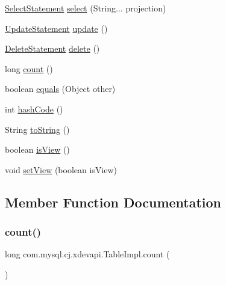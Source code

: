 \begin{DoxyCompactItemize}
\item 
\mbox{\hyperlink{interfacecom_1_1mysql_1_1cj_1_1xdevapi_1_1_select_statement}{Select\+Statement}} \mbox{\hyperlink{classcom_1_1mysql_1_1cj_1_1xdevapi_1_1_table_impl_a048429d90cca804cd60ce9a49f5b12fd}{select}} (String... projection)
\item 
\mbox{\hyperlink{interfacecom_1_1mysql_1_1cj_1_1xdevapi_1_1_update_statement}{Update\+Statement}} \mbox{\hyperlink{classcom_1_1mysql_1_1cj_1_1xdevapi_1_1_table_impl_a4f6da4761f5ff7becb0737c11b0ea0db}{update}} ()
\item 
\mbox{\hyperlink{interfacecom_1_1mysql_1_1cj_1_1xdevapi_1_1_delete_statement}{Delete\+Statement}} \mbox{\hyperlink{classcom_1_1mysql_1_1cj_1_1xdevapi_1_1_table_impl_ab12665d608984e6774957947f6a22c7c}{delete}} ()
\item 
long \mbox{\hyperlink{classcom_1_1mysql_1_1cj_1_1xdevapi_1_1_table_impl_a855ae05acfd531e69738a8a88824fe8c}{count}} ()
\item 
boolean \mbox{\hyperlink{classcom_1_1mysql_1_1cj_1_1xdevapi_1_1_table_impl_a0f66e0bb59cb1537222b61858537daa3}{equals}} (Object other)
\item 
int \mbox{\hyperlink{classcom_1_1mysql_1_1cj_1_1xdevapi_1_1_table_impl_aeba962a3af205b868ef18847f8f166a8}{hash\+Code}} ()
\item 
String \mbox{\hyperlink{classcom_1_1mysql_1_1cj_1_1xdevapi_1_1_table_impl_aa7bfb3a165db21c34060c5cbb6b111b2}{to\+String}} ()
\item 
boolean \mbox{\hyperlink{classcom_1_1mysql_1_1cj_1_1xdevapi_1_1_table_impl_a92b2db897ad5ce4f950422956bfc4027}{is\+View}} ()
\item 
void \mbox{\hyperlink{classcom_1_1mysql_1_1cj_1_1xdevapi_1_1_table_impl_ae3b7e58d7a85393a4d2baf8115acf90c}{set\+View}} (boolean is\+View)
\end{DoxyCompactItemize}


\subsection{Member Function Documentation}
\mbox{\label{classcom_1_1mysql_1_1cj_1_1xdevapi_1_1_table_impl_a855ae05acfd531e69738a8a88824fe8c}} 
\subsubsection{\texorpdfstring{count()}{count()}}
{\footnotesize\ttfamily long com.\+mysql.\+cj.\+xdevapi.\+Table\+Impl.\+count (\begin{DoxyParamCaption}{ }\end{DoxyParamCaption})}

